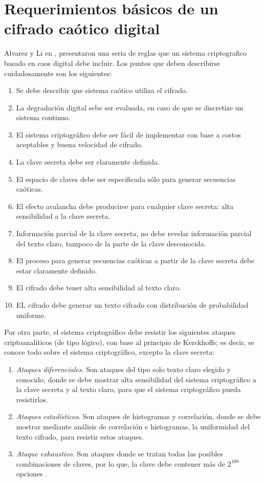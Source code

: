 \section{Requerimientos básicos de un cifrado caótico digital}
Alvarez y Li en \cite{AyL_2006}, presentaron una seria de reglas que un sistema criptografico basado en caos digital debe incluir. Los puntos que deben describirse cuidadosamente son los siguientes:
\begin{enumerate}
\item Se debe describir que sistema caótico utiliza el cifrado.
\item La degradación digital sebe ser evaluada, en caso de que se discretize un sistema continuo.
\item El sistema criptográfico debe ser fácil de implementar con base a costos aceptables y buena velocidad de cifrado.
\item La clave secreta debe ser claramente definida.
\item El espacio de claves debe ser especificada sólo para generar secuencias caóticas.
\item El efecto avalancha debe producirse para cualquier clave secreta: alta sensibilidad a la clave secreta.
\item Información parcial de la clave secreta, no debe revelar información parcial del texto claro, tampoco de la parte de la clave desconocida.
\item El proceso para generar secuencias caóticas a partir de la clave secreta debe estar claramente definido.
\item El cifrado debe tener alta sensibilidad al texto claro.
\item EL cifrado debe generar un texto cifrado con distribución de probabilidad uniforme. \\
\end{enumerate}

Por otra parte, el sistema criptográfico debe resistir los siguientes ataques criptoanalíticos (de tipo lógico), con base al principio de Kerckhoffs; es decir, se conoce todo sobre el sistema criptográfico, excepto la clave secreta:
\begin{enumerate}
\item \textit{Ataques diferenciales}. Son ataques del tipo solo texto claro elegido y conocido, donde se debe mostrar alta sensibilidad del sistema criptográfico a la clave secreta y al texto claro, para que el sistema criptográfico pueda resistirlos.
\item \textit{Ataques estadísticos}. Son ataques de histogramas y correlación, donde se debe mostrar mediante análisis de correlación e histogramas, la uniformidad del texto cifrado, para resistir estos ataques.  
\item \textit{Ataque exhaustivo}. Son ataques donde se tratan todas las posibles combinaciones de claves, por lo que, la clave debe contener más de $2^{100}$ opciones \cite{AyL_2006}. \\
\end{enumerate}

